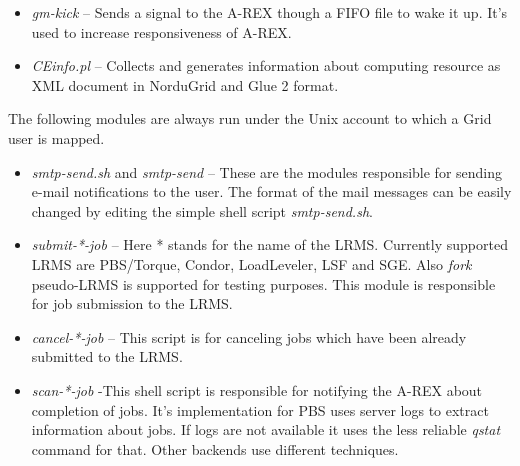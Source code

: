 \documentclass{article}                            %
\begin{document}


\begin{itemize}
\item \emph{gm-kick} -- Sends a signal to the A-REX though a FIFO file to
wake it up. It's used to increase responsiveness of A-REX.
\item \emph{CEinfo.pl} -- Collects and generates information about computing
resource as XML document in NorduGrid and Glue 2 format.
\end{itemize}

The following modules are always run under the Unix account to which
a Grid user is mapped.

\begin{itemize}
\item \textit{smtp-send.sh} and \textit{smtp-send} -- These are the modules
responsible for sending e-mail notifications to the user. The format
of the mail messages can be easily changed by editing the simple shell
script \textit{smtp-send.sh}. 
\item \textit{submit-{*}-job} -- Here {*} stands for the name of the LRMS.
Currently supported LRMS are PBS/Torque, Condor, LoadLeveler, LSF
and SGE. Also \emph{fork} pseudo-LRMS is supported for testing purposes.
This module is responsible for job submission to the LRMS.
\item \textit{cancel-{*}-job} -- This script is for canceling jobs which
have been already submitted to the LRMS.
\item \textit{scan-{*}-job} -This shell script is responsible for notifying
the A-REX about completion of jobs. It's implementation for PBS uses
server logs to extract information about jobs. If logs are not available
it uses the less reliable \emph{qstat} command for that. Other backends
use different techniques.
\end{itemize}
\end{document}
